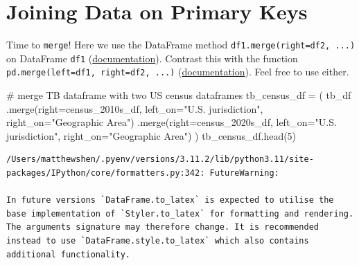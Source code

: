 \documentclass[
  letterpaper,
  DIV=11,
  numbers=noendperiod]{scrreprt}
\newenvironment{Shaded}{\begin{snugshade}}{\end{snugshade}}
\newcommand{\CommentTok}[1]{\textcolor[rgb]{0.37,0.37,0.37}{#1}}
\newcommand{\DecValTok}[1]{\textcolor[rgb]{0.68,0.00,0.00}{#1}}
\newcommand{\NormalTok}[1]{\textcolor[rgb]{0.00,0.23,0.31}{#1}}
\newcommand{\OperatorTok}[1]{\textcolor[rgb]{0.37,0.37,0.37}{#1}}
\newcommand{\StringTok}[1]{\textcolor[rgb]{0.13,0.47,0.30}{#1}}
\begin{document}
\hypertarget{joining-data-on-primary-keys}{%
\section{Joining Data on Primary
Keys}\label{joining-data-on-primary-keys}}

Time to \texttt{merge}! Here we use the DataFrame method
\texttt{df1.merge(right=df2,\ ...)} on DataFrame \texttt{df1}
(\href{https://pandas.pydata.org/docs/reference/api/pandas.DataFrame.merge.html}{documentation}).
Contrast this with the function
\texttt{pd.merge(left=df1,\ right=df2,\ ...)}
(\href{https://pandas.pydata.org/docs/reference/api/pandas.merge.html?highlight=pandas\%20merge\#pandas.merge}{documentation}).
Feel free to use either.

\begin{Shaded}
\begin{Highlighting}[]
\CommentTok{\# merge TB dataframe with two US census dataframes}
\NormalTok{tb\_census\_df }\OperatorTok{=}\NormalTok{ (}
\NormalTok{    tb\_df}
\NormalTok{    .merge(right}\OperatorTok{=}\NormalTok{census\_2010s\_df,}
\NormalTok{           left\_on}\OperatorTok{=}\StringTok{"U.S. jurisdiction"}\NormalTok{, right\_on}\OperatorTok{=}\StringTok{"Geographic Area"}\NormalTok{)}
\NormalTok{    .merge(right}\OperatorTok{=}\NormalTok{census\_2020s\_df,}
\NormalTok{           left\_on}\OperatorTok{=}\StringTok{"U.S. jurisdiction"}\NormalTok{, right\_on}\OperatorTok{=}\StringTok{"Geographic Area"}\NormalTok{)}
\NormalTok{)}
\NormalTok{tb\_census\_df.head(}\DecValTok{5}\NormalTok{)}
\end{Highlighting}
\end{Shaded}

\begin{verbatim}
/Users/matthewshen/.pyenv/versions/3.11.2/lib/python3.11/site-packages/IPython/core/formatters.py:342: FutureWarning:

In future versions `DataFrame.to_latex` is expected to utilise the base implementation of `Styler.to_latex` for formatting and rendering. The arguments signature may therefore change. It is recommended instead to use `DataFrame.style.to_latex` which also contains additional functionality.
\end{verbatim}
\end{document}
